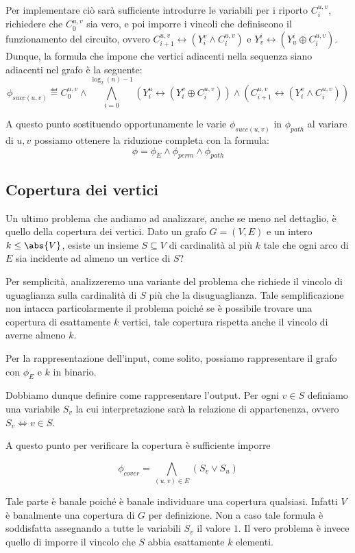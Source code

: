 Per implementare ciò sarà sufficiente introdurre le variabili per i riporto \(C_i^{u,v}\), richiedere che \(C_0^{u,v}\) sia vero, e poi imporre i vincoli che definiscono il funzionamento del circuito, ovvero \(C_{i+1}^{u,v} \leftrightarrow (Y_i^v \land C_i^{u,v})\) e \(Y_v^i \leftrightarrow (Y_u^i \oplus C_i^{u,v})\). Dunque, la formula che impone che vertici adiacenti nella sequenza siano adiacenti nel grafo è la seguente:
\[\phi_{succ(u,v)} \eqdef C_0^{u,v}\land \bigwedge_{i=0}^{\log_2(n)-1} (Y_i^u \leftrightarrow (Y_i^v \oplus C_i^{u,v}))\land (C_{i+1}^{u,v} \leftrightarrow (Y_{i}^v \land C_{i}^{u,v}))\]

A questo punto sostituendo opportunamente le varie \(\phi_{succ(u,v)}\) in \(\phi_{path}\) al variare di \(u,v\) possiamo ottenere la riduzione completa con la formula:
\[\phi = \phi_E \land \phi_{perm} \land \phi_{path}\]

\subsection{Copertura dei vertici}

Un ultimo problema che andiamo ad analizzare, anche se meno nel dettaglio, è quello della copertura dei vertici. Dato un grafo \(G=(V,E)\) e un intero \(k\leq \abs{V}\), esiste un insieme \(S\subseteq V\) di cardinalità al più \(k\) tale che ogni arco di \(E\) sia incidente ad almeno un vertice di \(S\)?

Per semplicità, analizzeremo una variante del problema che richiede il vincolo di uguaglianza sulla cardinalità di \(S\) più che la disuguaglianza. Tale semplificazione non intacca particolarmente il problema poiché se è possibile trovare una copertura di esattamente \(k\) vertici, tale copertura rispetta anche il vincolo di averne almeno \(k\).

Per la rappresentazione dell'input, come solito, possiamo rappresentare il grafo con \(\phi_E\) e \(k\) in binario.

Dobbiamo dunque definire come rappresentare l'output. Per ogni \(v \in S\) definiamo una variabile \(S_v\) la cui interpretazione sarà la relazione di appartenenza, ovvero \(S_v \iff v \in S\).

A questo punto per verificare la copertura è sufficiente imporre 

\[\phi_{cover} = \bigwedge_{(u,v) \in E} (S_v \lor S_u)\]

Tale parte è banale poiché è banale individuare una copertura qualsiasi. Infatti \(V\) è banalmente una copertura di \(G\) per definizione. Non a caso tale formula è soddisfatta assegnando a tutte le variabili \(S_v\) il valore \(1\). Il vero problema è invece quello di imporre il vincolo che \(S\) abbia esattamente \(k\) elementi.

